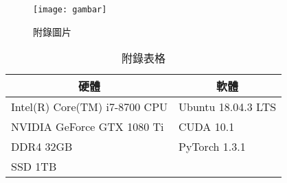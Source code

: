 


\begin{figure}[h]
  \centerline{\texttt{[image: gambar]}}
  \caption*{附錄圖片}
  \label{figure:apxfig1}
\end{figure}

\begin{table}[h]
    \centering
    \caption*{附錄表格}
    \label{table:apxtab1}
    \begin{tabular}{p{}p{}}
        \hline
        \multicolumn{1}{c}{\textbf{硬體}} & \multicolumn{1}{c}{\textbf{軟體}} \\ \hline
        Intel(R) Core(TM) i7-8700 CPU      & Ubuntu 18.04.3 LTS               \\
        NVIDIA GeForce GTX 1080 Ti         & CUDA 10.1                        \\
        DDR4 32GB                          & PyTorch 1.3.1                    \\
        SSD 1TB                            &                                  \\ \hline
    \end{tabular}
\end{table}